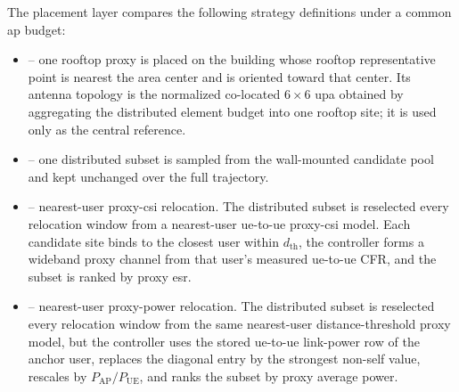 The placement layer compares the following strategy definitions under a common \gls{ap} budget:
\begin{itemize}
    \item[]  -- one rooftop proxy is placed on the building whose rooftop representative point is nearest the area center and is oriented toward that center. Its antenna topology is the normalized co-located $\num{6}\times\num{6}$ \gls{upa} obtained by aggregating the distributed element budget into one rooftop site; it is used only as the central reference.
    \item[]  -- one distributed subset is sampled from the wall-mounted candidate pool and kept unchanged over the full trajectory.
    \item[]  -- nearest-user proxy-\gls{csi} relocation. The distributed subset is reselected every relocation window from a nearest-user \gls{ue}-to-\gls{ue} proxy-\gls{csi} model. Each candidate site binds to the closest user within $d_{\mathrm{th}}$, the controller forms a wideband proxy channel from that user's measured \gls{ue}-to-\gls{ue} CFR, and the subset is ranked by proxy \gls{esr}.
    \item[]  -- nearest-user proxy-power relocation. The distributed subset is reselected every relocation window from the same nearest-user distance-threshold proxy model, but the controller uses the stored \gls{ue}-to-\gls{ue} link-power row of the anchor user, replaces the diagonal entry by the strongest non-self value, rescales by $P_{\mathrm{AP}}/P_{\mathrm{UE}}$, and ranks the subset by proxy average power.
\end{itemize}
